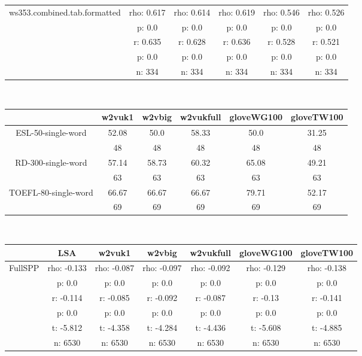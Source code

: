 \documentclass{article}
\begin{document}
\begin{tabular}{cccccc|}
\hline
\multicolumn{1}{|c|}{\multirow{5}{*}{ws353.combined.tab.formatted}} & rho: 0.617 & rho: 0.614 & rho: 0.619 & rho: 0.546 & rho: 0.526 \\
\multicolumn{1}{|c|}{} & p: 0.0 & p: 0.0 & p: 0.0 & p: 0.0 & p: 0.0 \\
\multicolumn{1}{|c|}{} & r: 0.635 & r: 0.628 & r: 0.636 & r: 0.528 & r: 0.521 \\
\multicolumn{1}{|c|}{} & p: 0.0 & p: 0.0 & p: 0.0 & p: 0.0 & p: 0.0 \\
\multicolumn{1}{|c|}{} & n: 334 & n: 334 & n: 334 & n: 334 & n: 334 \\
\hline
\end{tabular}\\
\begin{tabular}{cccccc|}\cline{2-6}
&\multicolumn{1}{|c}{w2vuk1} & w2vbig & w2vukfull & gloveWG100 & gloveTW100 \\\hline
\multicolumn{1}{|c|}{\multirow{2}{*}{ESL-50-single-word}} & 52.08 & 50.0 & 58.33 & 50.0 & 31.25 \\
\multicolumn{1}{|c|}{} & 48 & 48 & 48 & 48 & 48 \\
\hline
\multicolumn{1}{|c|}{\multirow{2}{*}{RD-300-single-word}} & 57.14 & 58.73 & 60.32 & 65.08 & 49.21 \\
\multicolumn{1}{|c|}{} & 63 & 63 & 63 & 63 & 63 \\
\hline
\multicolumn{1}{|c|}{\multirow{2}{*}{TOEFL-80-single-word}} & 66.67 & 66.67 & 66.67 & 79.71 & 52.17 \\
\multicolumn{1}{|c|}{} & 69 & 69 & 69 & 69 & 69 \\
\hline
\end{tabular}\\
\begin{tabular}{ccccccc|}\cline{2-7}
&\multicolumn{1}{|c}{LSA} & w2vuk1 & w2vbig & w2vukfull & gloveWG100 & gloveTW100 \\\hline
\multicolumn{1}{|c|}{\multirow{6}{*}{FullSPP}} & rho: -0.133 & rho: -0.087 & rho: -0.097 & rho: -0.092 & rho: -0.129 & rho: -0.138 \\
\multicolumn{1}{|c|}{} & p: 0.0 & p: 0.0 & p: 0.0 & p: 0.0 & p: 0.0 & p: 0.0 \\
\multicolumn{1}{|c|}{} & r: -0.114 & r: -0.085 & r: -0.092 & r: -0.087 & r: -0.13 & r: -0.141 \\
\multicolumn{1}{|c|}{} & p: 0.0 & p: 0.0 & p: 0.0 & p: 0.0 & p: 0.0 & p: 0.0 \\
\multicolumn{1}{|c|}{} & t: -5.812 & t: -4.358 & t: -4.284 & t: -4.436 & t: -5.608 & t: -4.885 \\
\multicolumn{1}{|c|}{} & n: 6530 & n: 6530 & n: 6530 & n: 6530 & n: 6530 & n: 6530 \\
\hline
\end{tabular}\\
\end{document}
